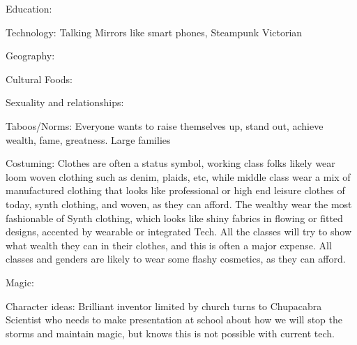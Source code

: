 \documentclass[blue]{GL2020}
\begin{document}
Education:

Technology:		Talking Mirrors like smart phones, Steampunk Victorian

Geography:

Cultural Foods:

Sexuality and relationships:

Taboos/Norms:		Everyone wants to raise themselves up, stand out, achieve wealth, fame, greatness.  Large families 

Costuming:		Clothes are often a status symbol, working class folks likely wear loom woven clothing such as denim, plaids, etc, while middle class wear a mix of manufactured clothing that looks like professional or high end leisure clothes of today, synth clothing, and woven, as they can afford.  The wealthy wear the most fashionable of Synth clothing, which looks like shiny fabrics in flowing or fitted designs, accented by wearable or integrated Tech.  All the classes will try to show what wealth they can in their clothes, and this is often a major expense.  All classes and genders are likely to wear some flashy cosmetics, as they can afford.

Magic:

Character ideas:  Brilliant inventor limited by church turns to Chupacabra
									Scientist who needs to make presentation at school about how we will stop the storms and
										maintain magic, but knows this is not possible with current tech.
									
\end{document}
